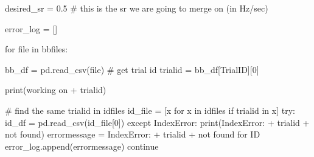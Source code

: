 \documentclass[
  letterpaper,
  DIV=11,
  numbers=noendperiod]{scrreprt}
\newenvironment{Shaded}{\begin{snugshade}}{\end{snugshade}}
\newcommand{\BuiltInTok}[1]{\textcolor[rgb]{0.00,0.23,0.31}{#1}}
\newcommand{\CommentTok}[1]{\textcolor[rgb]{0.37,0.37,0.37}{#1}}
\newcommand{\ControlFlowTok}[1]{\textcolor[rgb]{0.00,0.23,0.31}{#1}}
\newcommand{\DecValTok}[1]{\textcolor[rgb]{0.68,0.00,0.00}{#1}}
\newcommand{\FloatTok}[1]{\textcolor[rgb]{0.68,0.00,0.00}{#1}}
\newcommand{\KeywordTok}[1]{\textcolor[rgb]{0.00,0.23,0.31}{#1}}
\newcommand{\NormalTok}[1]{\textcolor[rgb]{0.00,0.23,0.31}{#1}}
\newcommand{\OperatorTok}[1]{\textcolor[rgb]{0.37,0.37,0.37}{#1}}
\newcommand{\PreprocessorTok}[1]{\textcolor[rgb]{0.68,0.00,0.00}{#1}}
\newcommand{\StringTok}[1]{\textcolor[rgb]{0.13,0.47,0.30}{#1}}
\begin{document}
\begin{Shaded}
\begin{Highlighting}[]
\NormalTok{desired\_sr }\OperatorTok{=} \FloatTok{0.5}    \CommentTok{\# this is the sr we are going to merge on (in Hz/sec)}

\NormalTok{error\_log }\OperatorTok{=}\NormalTok{ []}

\ControlFlowTok{for} \BuiltInTok{file} \KeywordTok{in}\NormalTok{ bbfiles:}

\NormalTok{    bb\_df }\OperatorTok{=}\NormalTok{ pd.read\_csv(}\BuiltInTok{file}\NormalTok{)}
    \CommentTok{\# get trial id}
\NormalTok{    trialid }\OperatorTok{=}\NormalTok{ bb\_df[}\StringTok{\textquotesingle{}TrialID\textquotesingle{}}\NormalTok{][}\DecValTok{0}\NormalTok{]}

    \BuiltInTok{print}\NormalTok{(}\StringTok{\textquotesingle{}working on \textquotesingle{}} \OperatorTok{+}\NormalTok{ trialid)}
    
    \CommentTok{\# find the same trialid in idfiles}
\NormalTok{    id\_file }\OperatorTok{=}\NormalTok{ [x }\ControlFlowTok{for}\NormalTok{ x }\KeywordTok{in}\NormalTok{ idfiles }\ControlFlowTok{if}\NormalTok{ trialid }\KeywordTok{in}\NormalTok{ x]}
    \ControlFlowTok{try}\NormalTok{:}
\NormalTok{        id\_df }\OperatorTok{=}\NormalTok{ pd.read\_csv(id\_file[}\DecValTok{0}\NormalTok{])}
    \ControlFlowTok{except} \PreprocessorTok{IndexError}\NormalTok{:}
        \BuiltInTok{print}\NormalTok{(}\StringTok{\textquotesingle{}IndexError: \textquotesingle{}} \OperatorTok{+}\NormalTok{ trialid }\OperatorTok{+} \StringTok{\textquotesingle{} not found\textquotesingle{}}\NormalTok{)}
\NormalTok{        errormessage }\OperatorTok{=} \StringTok{\textquotesingle{}IndexError: \textquotesingle{}} \OperatorTok{+}\NormalTok{ trialid }\OperatorTok{+} \StringTok{\textquotesingle{} not found for ID\textquotesingle{}}
\NormalTok{        error\_log.append(errormessage)}
        \ControlFlowTok{continue}
    

\end{Highlighting}
\end{Shaded}
\end{document}
